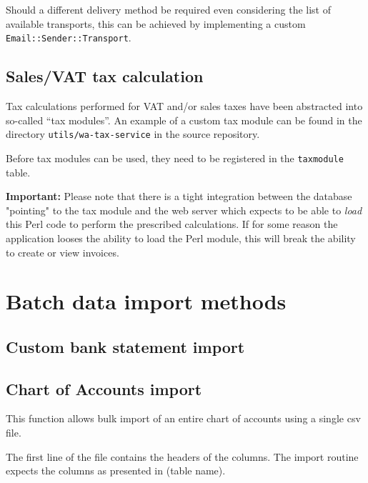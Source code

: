 Should a different delivery method be required even considering the list of available transports,
this can be achieved by implementing a custom \texttt{Email::Sender::Transport}.

\section{Sales/VAT tax calculation}
\label{sec-customization-sales-tax}

Tax calculations performed for VAT and/or sales taxes have been abstracted into so-called
``tax modules''.  An example of a custom tax module can be found in the directory
\texttt{utils/wa-tax-service} in the source repository.

Before tax modules can be used, they need to be registered in the \texttt{taxmodule} table.

\textbf{Important:} Please note that there is a tight integration between the database "pointing"
to the tax module and the web server which expects to be able to \textit{load} this Perl code to
perform the prescribed calculations.
If for some reason the application looses the ability to load the Perl module, this will break
the ability to create or view invoices.

\chapter{Batch data import methods}
\label{cha-customization-batch-import}

\section{Custom bank statement import}
\label{sec-customization-batch-import-bank-statement}

\section{Chart of Accounts import}
\label{subsec-customization-import-coa}

This function allows bulk import of an entire chart of accounts using a
single \gls{csv} file.

The first line of the file contains the headers of the columns. The
import routine expects the columns as presented in (table name).

